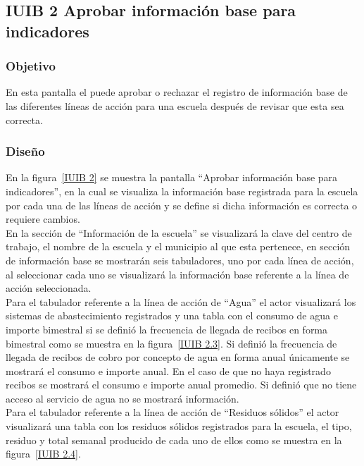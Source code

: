 \subsection{IUIB 2 Aprobar información base para indicadores}

\subsubsection{Objetivo}

      En esta pantalla el  puede aprobar o rechazar el registro de información base de las diferentes líneas de acción para una escuela después de revisar que esta sea correcta.

\subsubsection{Diseño}

    
    En la figura~\ref{IUIB 2} se muestra la pantalla ``Aprobar información base para indicadores'', en la cual se visualiza la información base registrada para la escuela por cada una de las líneas de acción y se define si dicha información es correcta o requiere cambios.\\
    
      En la sección de ``Información de la escuela'' se visualizará la clave del centro de trabajo, el nombre de la escuela y el municipio al que esta pertenece, en sección de información base se mostrarán seis tabuladores, uno por cada línea de acción, al seleccionar cada uno se visualizará la información base referente a la línea de acción seleccionada.\\
      
      Para el tabulador referente a la línea de acción de ``Agua'' el actor visualizará los sistemas de abastecimiento registrados y una tabla con el consumo de agua e importe bimestral si se definió la frecuencia de llegada de recibos en forma bimestral como se muestra en la figura~\ref{IUIB 2.3}. Si definió la frecuencia de llegada de recibos de cobro por concepto de agua en forma anual únicamente se mostrará el consumo e importe anual. En el caso de que no haya registrado recibos se mostrará el consumo e importe anual promedio. Si definió que no tiene acceso al servicio de agua no se mostrará información.\\
      
      Para el tabulador referente a la línea de acción de ``Residuos sólidos'' el actor visualizará una tabla con los residuos sólidos registrados para la escuela, el tipo, residuo y total semanal producido de cada uno de ellos como se muestra en la figura~\ref{IUIB 2.4}.\\
      
